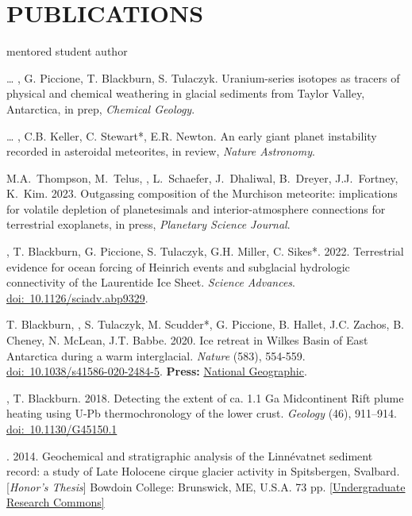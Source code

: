 \section*{PUBLICATIONS}
\hfill* mentored student author
\newcommand{\inprep}[1]{in prep, \textit{#1}}
\newcommand{\submitted}[1]{submitted, \textit{#1}}
\newcommand{\inreview}[1]{in review, \textit{#1}}
\newcommand{\inpress}[1]{in press, \textit{#1}}
\newcommand{\doi}[1]{\href{https://doi.org/#1}{doi:~#1}}

\begin{etaremune} [itemsep=4pt, leftmargin=3ex]
\item[\dots] \ghedwards, G. Piccione, T. Blackburn,  S. Tulaczyk. Uranium-series isotopes as tracers of physical and chemical weathering in glacial sediments from Taylor Valley, Antarctica, \inprep{Chemical Geology}.
\item[\dots] \ghedwards, C.B. Keller, C. Stewart*, E.R. Newton. An early giant planet instability recorded in asteroidal meteorites, \inreview{Nature Astronomy}.
\item M.A.~Thompson, M.~Telus, \ghedwards, L.~Schaefer, J.~Dhaliwal, B.~Dreyer, J.J.~Fortney, K.~Kim. 2023. Outgassing composition of the Murchison meteorite: implications for volatile depletion of planetesimals and interior-atmosphere connections for terrestrial exoplanets, \inpress{Planetary Science Journal}. 
\item \ghedwards, T. Blackburn, G. Piccione, S. Tulaczyk, G.H. Miller, C. Sikes*. 2022. Terrestrial evidence for ocean forcing of Heinrich events and subglacial hydrologic connectivity of the Laurentide Ice Sheet. \textit{Science Advances}. \doi{10.1126/sciadv.abp9329}.
\item T. Blackburn, \ghedwards, S. Tulaczyk, M. Scudder*, G. Piccione, B. Hallet, J.C. Zachos, B. Cheney, N. McLean, J.T. Babbe. 2020. Ice retreat in Wilkes Basin of East Antarctica during a warm interglacial. \textit{Nature} (583), 554-559. \doi{10.1038/s41586-020-2484-5}. \textbf{Press:} \href{https://www.nationalgeographic.com/science/2020/07/east-antarctic-ice-sheet-more-vulnerable-to-melting-than-thought/}{National Geographic}.
\item \ghedwards, T. Blackburn. 2018. Detecting the extent of ca. 1.1 Ga Midcontinent Rift plume heating using U-Pb thermochronology of the lower crust. \textit{Geology} (46), 911–914. \doi{10.1130/G45150.1} 
\item \ghedwards. 2014. Geochemical and stratigraphic analysis of the Linnévatnet sediment record: a study of Late Holocene cirque glacier activity in Spitsbergen, Svalbard. [\textit{Honor’s Thesis}] Bowdoin College: Brunswick, ME, U.S.A. 73 pp. \href{https://digitalcommons.bowdoin.edu/honorsprojects/12/}{[Undergraduate Research Commons]}
\end{etaremune}